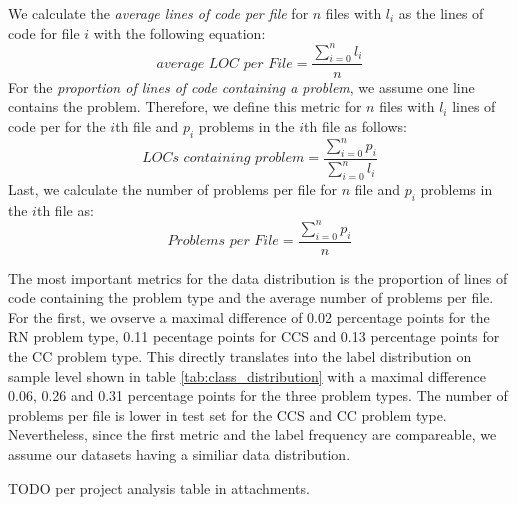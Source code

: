 We calculate the \textit{average lines of code per file} for $n$ files with $l_i$ as the lines of code for file $i$ with the following equation:
\[
  \textit{average LOC per File} = \frac{\sum_{i=0}^n{l_i}}{n}  
\]
For the \textit{proportion of lines of code containing a problem}, we assume one line contains the problem. Therefore, we define this metric for $n$ files with $l_i$ lines of code per for the $i$th file and $p_i$ problems in the $i$th file as follows:
\[
    \textit{LOCs containing problem} = \frac{\sum_{i=0}^n{p_i}}{\sum_{i=0}^n{l_i}}
\]
Last, we calculate the number of problems per file for $n$ file and $p_i$ problems in the $i$th file as:
\[
    \textit{Problems per File} = \frac{\sum_{i=0}^n{p_i}}{n}
\]

The most important metrics for the data distribution is the proportion of lines of code containing the problem type and the average number of problems per file. For the first, we ovserve a maximal difference of 0.02 percentage points for the RN problem type, 0.11 pecentage points for CCS and 0.13 percentage points for the CC problem type. This directly translates into the label distribution on sample level shown in table \ref{tab:class_distribution} with a maximal difference 0.06, 0.26 and 0.31 percentage points for the three problem types.
The number of problems per file is lower in test set for the CCS and CC problem type. Nevertheless, since the first metric and the label frequency are compareable, we assume our datasets having a similiar data distribution. 

TODO per project analysis table in attachments.

